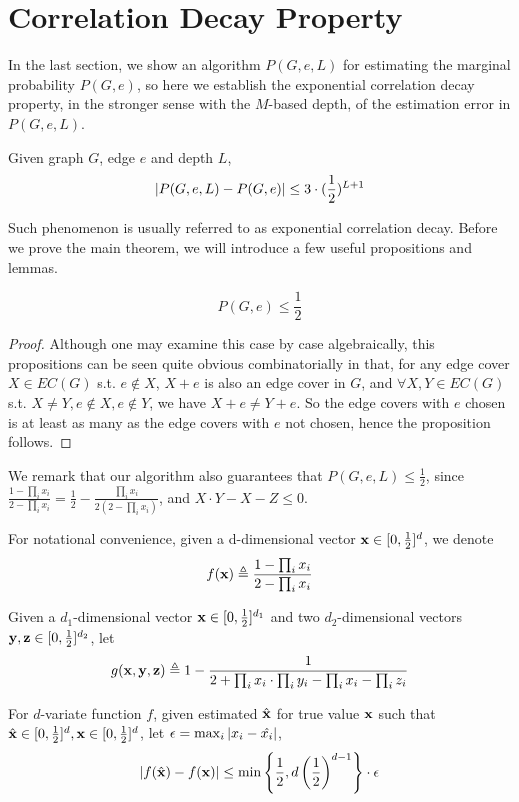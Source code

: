 \section{Correlation Decay Property}

In the last section, we show an algorithm $P(G,e,L)$ for estimating the marginal probability $P(G,e)$,
so here we establish the exponential correlation decay property, in the stronger sense with the
$M$-based depth,
of the estimation error in $P(G,e,L)$.%

\begin{Thm}
	\label{cd-main-theorem}
	Given graph $G$, edge $e$ and depth $L$,
	\[\left\vert P(G,e,L) - P(G,e)\right\vert \leq 3\cdot(\frac{1}{2})^{L+1}\]
\end{Thm}

Such phenomenon is usually referred to as exponential correlation decay. Before we prove the main theorem, we will introduce a few useful propositions and lemmas.

\begin{Prop}
	\[P(G, e) \leq \frac{1}{2}\]
\end{Prop}

\begin{proof}
	Although one may examine this case by case algebraically, this propositions can be seen quite obvious combinatorially in that, for any edge cover $X \in EC(G)$ s.t. $e \notin X$, $X+e$ is also an edge cover in $G$, and $\forall X,Y \in EC(G)$ s.t. $X \neq Y, e \notin X, e\notin Y$, we have $X+e \neq Y+e$. So the edge covers with $e$ chosen is at least as many as the edge covers with $e$ not chosen, hence the proposition follows.
\end{proof}

We remark that our algorithm also guarantees that $P(G,e,L) \leq \frac{1}{2}$, since $\frac{1 - \prod_i x_i}{2 - \prod_i x_i} = \frac{1}{2} - \frac{\prod_i x_i}{2(2 - \prod_i x_i)}$, and $X\cdot Y - X - Z \leq 0$.

For notational convenience, given a d-dimensional vector ${\bf x} \in [0, \frac{1}{2}]^d$, we denote
\[ f({\bf x}) \triangleq \frac{1- \prod_i x_i}{2 - \prod_i x_i}\]

Given a $d_1$-dimensional vector ${\bf x} \in [0, \frac{1}{2}]^{d_1}$ and two $d_2$-dimensional vectors ${\bf y,z} \in [0, \frac{1}{2}]^{d_2}$, let
\[ g({\bf x,y,z}) \triangleq  1- \frac{1}{2+\prod_i x_i \cdot \prod_i y_i - \prod_i x_i - \prod_i z_i} \]


	\begin{Lem}
		\label{meanvalue1}
		For $d$-variate function $f$, given estimated $\hat{\bf x}$ for true value ${\bf x}$ such that $\hat{\bf x} \in  [0, \frac{1}{2}]^d, {\bf x} \in [0, \frac{1}{2}]^d$, let $\epsilon = \max_i{\left\vert x_i - \hat{x_i}\right\vert}$,
		\begin{align*}
			\left\vert f(\hat{\bf x}) - f({\bf x})\right\vert
		\leq  \min{\left\{\frac{1}{2}, d \left( \frac{1}{2} \right)^{d-1}\right\}} \cdot \epsilon
		\end{align*}
	\end{Lem}

